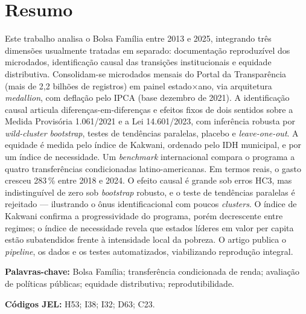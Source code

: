 \documentclass[12pt,a4paper,oneside]{article}
\begin{document}
\section*{Resumo}
\begin{singlespace}\small\noindent
Este trabalho analisa o Bolsa Família entre 2013 e 2025, integrando três dimensões usualmente tratadas em separado: documentação reproduzível dos microdados, identificação causal das transições institucionais e equidade distributiva. Consolidam-se microdados mensais do Portal da Transparência (mais de 2,2 bilhões de registros) em painel estado$\times$ano, via arquitetura \textit{medallion}, com deflação pelo IPCA (base dezembro de 2021). A identificação causal articula diferenças-em-diferenças e efeitos fixos de dois sentidos sobre a Medida Provisória 1.061/2021 e a Lei 14.601/2023, com inferência robusta por \textit{wild-cluster bootstrap}, testes de tendências paralelas, placebo e \textit{leave-one-out}. A equidade é medida pelo índice de Kakwani, ordenado pelo IDH municipal, e por um índice de necessidade. Um \textit{benchmark} internacional compara o programa a quatro transferências condicionadas latino-americanas. Em termos reais, o gasto cresceu 283\,\% entre 2018 e 2024. O efeito causal é grande sob erros HC3, mas indistinguível de zero sob \textit{bootstrap} robusto, e o teste de tendências paralelas é rejeitado --- ilustrando o ônus identificacional com poucos \textit{clusters}. O índice de Kakwani confirma a progressividade do programa, porém decrescente entre regimes; o índice de necessidade revela que estados líderes em valor per capita estão subatendidos frente à intensidade local da pobreza. O artigo publica o \textit{pipeline}, os dados e os testes automatizados, viabilizando reprodução integral.

\vspace{6pt}\noindent\textbf{Palavras-chave:} Bolsa Família; transferência condicionada de renda; avaliação de políticas públicas; equidade distributiva; reprodutibilidade.

\vspace{4pt}\noindent\textbf{Códigos JEL:} H53; I38; I32; D63; C23.
\end{singlespace}

\vspace{6pt}
\end{document}

